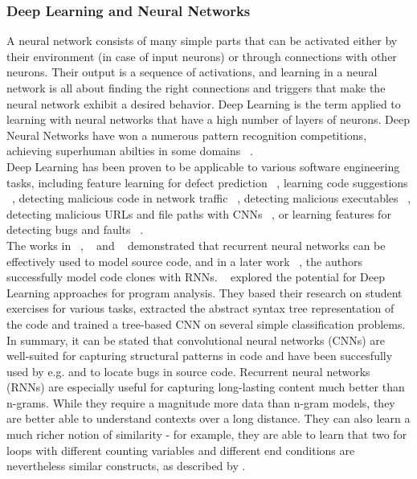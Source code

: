 \documentclass[
	a4paper,
	pagesize,
	pdftex,
	12pt,
	twoside, %
	BCOR=5mm, %
	ngerman,
	fleqn,
	final,
	]{scrartcl}
\begin{document}
\subsubsection{Deep Learning and Neural Networks}\label{Deep-Learning}
A neural network consists of many simple parts that can be activated either by their environment (in case of input neurons) or through connections with other neurons. Their output is a sequence of activations, and learning in a neural network is all about finding the right connections and triggers that make the neural network exhibit a desired behavior. Deep Learning is the term applied to learning with neural networks that have a high number of layers of neurons. Deep Neural Networks have won a numerous pattern recognition competitions, achieving superhuman abilties in some domains ~\cite{Schmidhuber.2015}.\\
Deep Learning has been proven to be applicable to various software engineering tasks, including feature learning for defect prediction ~\cite{Wang.2016}, learning code suggestions ~\cite{Bhoopchand.2016}, detecting malicious code in network traffic ~\cite{Elovici.2007}, detecting malicious executables ~\cite{Schultz.2000}, detecting malicious URLs and file paths with CNNs ~\cite{Saxe.2017}, or learning features for detecting bugs and faults ~\cite{Huo.2016,Gupta.2017b}. \\
The works in ~\cite{White.2015}, ~\cite{Dam.2016b} and ~\cite{Dam.2016} demonstrated that recurrent neural networks can be effectively used to model source code, and in a later work ~\cite{White.2016}, the authors successfully model code clones with RNNs. ~\cite{Mou.2014} explored the potential for Deep Learning approaches for program analysis. They based their research on student exercises for various tasks, extracted the abstract syntax tree representation of the code and trained a tree-based CNN on several simple classification problems.\\
In summary, it can be stated that convolutional neural networks (CNNs) are well-suited for capturing structural patterns in code \cite{Dam.2016} and have been succesfully used by e.g. \cite{Huo.2016} and \cite{Russell.2018} to locate bugs in source code. Recurrent neural networks (RNNs) are especially useful for capturing long-lasting content much better than n-grams. While they require a magnitude more data than n-gram models, they are better able to understand contexts over a long distance. They can also learn a much richer notion of similarity - for example, they are able to learn that two for loops with different counting variables and different end conditions are nevertheless similar constructs, as described by \cite{Allamanis.2018}. 
\end{document}

